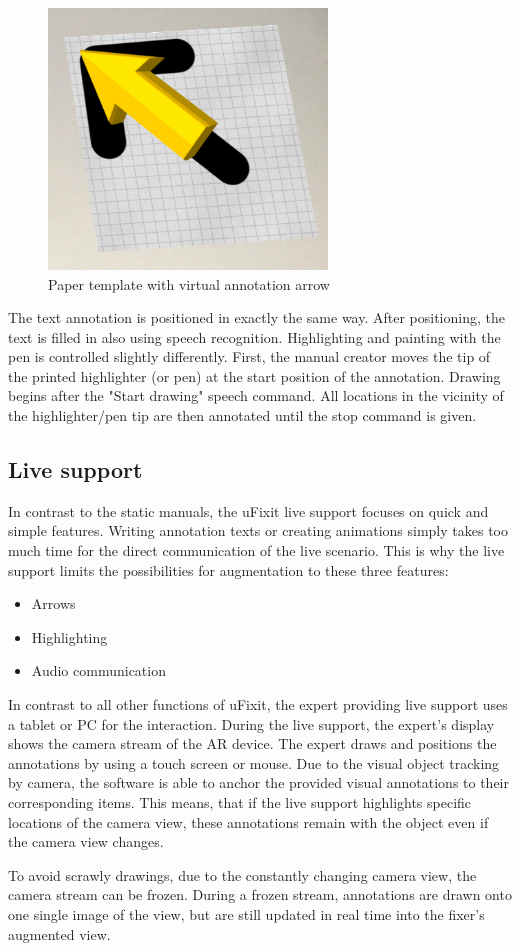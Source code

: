 \begin{figure}[H]
		\includegraphics[width=0.66\textwidth]{../images/paperArrowAugmented.png}
		\centering
		\caption{Paper template with virtual annotation arrow}
		\label{fig:cardBoard}
\end{figure}

The text annotation is positioned in exactly the same way. After positioning, the text is filled in also using speech recognition. Highlighting and painting with the pen is controlled slightly differently. First, the manual creator moves the tip of the printed highlighter (or pen) at the start position of the annotation. Drawing begins after the "Start drawing" speech command. All locations in the vicinity of the highlighter/pen tip are then annotated until the stop command is given.


\subsection{Live support}
In contrast to the static manuals, the uFixit live support focuses on quick and simple features. Writing annotation texts or creating animations simply takes too much time for the direct communication of the live scenario. This is why the live support limits the possibilities for augmentation to these three features:
\begin{itemize}
\item Arrows
\item Highlighting
\item Audio communication
\end{itemize}

In contrast to all other functions of uFixit, the expert providing live support uses a tablet or PC for the interaction. During the live support, the expert's display shows the camera stream of the AR device. The expert draws and positions the annotations by using a touch screen or mouse.
Due to the visual object tracking by camera, the software is able to anchor the provided visual annotations to their corresponding items. This means, that if the live support highlights specific locations of the camera view, these annotations remain with the object even if the camera view changes.

To avoid scrawly drawings, due to the constantly changing camera view, the camera stream can be frozen. During a frozen stream, annotations are drawn onto one single image of the view, but are still updated in real time into the fixer's augmented view.

